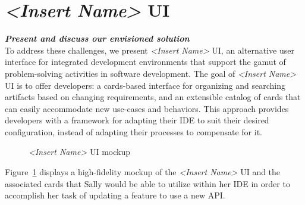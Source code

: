 \documentclass{ppig}
\newcommand{\bold}[1]{\textit{\textbf{\color{aoblue}#1}}} %
\newcommand{\nameUI}{\textit{<Insert Name>} UI} %
\begin{document}
\section{\nameUI{}}
\bold{Present and discuss our envisioned solution\\}
To address these challenges, we present \nameUI{}, an alternative user interface for integrated development environments that support the gamut of problem-solving activities in software development.
The goal of \nameUI{} is to offer developers: a cards-based interface for organizing and searching artifacts based on changing requirements, and an extensible catalog of cards that can easily accommodate new use-cases and behaviors.
This approach provides developers with a framework for adapting their IDE to suit their desired configuration, instead of adapting their processes to compensate for it.
\begin{figure}[h!]
	\caption{\nameUI{} mockup}
	\label{mockup}
	\vspace*{-1.5\baselineskip}
\end{figure}

Figure~\ref{mockup} displays a high-fidelity mockup of the \nameUI{} and the associated cards that Sally would be able to utilize within her IDE in order to accomplish her task of updating a feature to use a new API.
\end{document}
